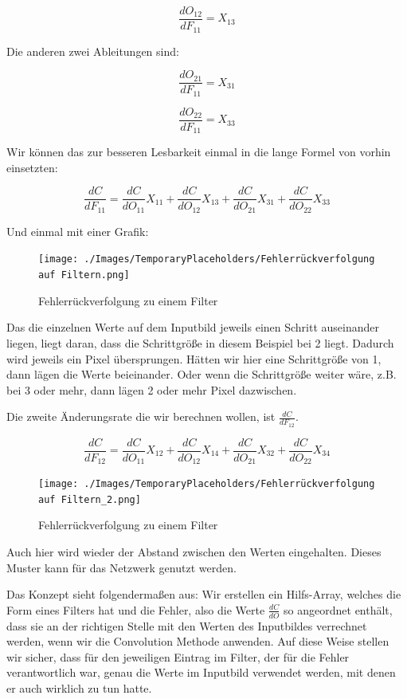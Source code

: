 \documentclass[12pt]{article}
\begin{document}
$$\frac{dO_{12}} {dF_{11}} = X_{13}$$

Die anderen zwei Ableitungen sind:


$$\frac{dO_{21}} {dF_{11}} = X_{31}$$

$$\frac{dO_{22}} {dF_{11}} = X_{33}$$

Wir können das zur besseren Lesbarkeit einmal in die lange Formel von vorhin einsetzten:

$$
\frac{dC}{dF_{11}} = 
\frac{dC} {dO_{11}} X_{11}+
\frac{dC} {dO_{12}} X_{13}+
\frac{dC} {dO_{21}} X_{31}+
\frac{dC} {dO_{22}} X_{33}
$$

Und einmal mit einer Grafik:

\begin{figure}[H]
\centering
\texttt{[image: ./Images/TemporaryPlaceholders/Fehlerrückverfolgung auf Filtern.png]}
\caption{Fehlerrückverfolgung zu einem Filter}
\label{Fehlerrückverfolgung zu einem Filter v1}
\end{figure}

Das die einzelnen Werte auf dem Inputbild jeweils einen Schritt auseinander liegen, liegt daran, dass die Schrittgröße in diesem Beispiel bei 2 liegt. Dadurch wird jeweils ein Pixel übersprungen. Hätten wir hier eine Schrittgröße von 1, dann lägen die Werte beieinander. Oder wenn die Schrittgröße weiter wäre, z.B. bei 3 oder mehr, dann lägen 2 oder mehr Pixel dazwischen.

Die zweite Änderungsrate die wir berechnen wollen, ist $\frac{dC}{dF_{12}}$. 


$$
\frac{dC}{dF_{12}} = 
\frac{dC} {dO_{11}} X_{12}+
\frac{dC} {dO_{12}} X_{14}+
\frac{dC} {dO_{21}} X_{32}+
\frac{dC} {dO_{22}} X_{34}
$$

\begin{figure}[H]
\centering
\texttt{[image: ./Images/TemporaryPlaceholders/Fehlerrückverfolgung auf Filtern\_2.png]}
\caption{Fehlerrückverfolgung zu einem Filter}
\label{Fehlerrückverfolgung zu einem Filter v2}
\end{figure}

Auch hier wird wieder der Abstand zwischen den Werten eingehalten. Dieses Muster kann für das Netzwerk genutzt werden. 

Das Konzept sieht folgendermaßen aus: Wir erstellen ein Hilfs-Array, welches die Form eines Filters hat und die Fehler, also die Werte $\frac{dC} {dO}$ so angeordnet enthält, dass sie an der richtigen Stelle mit den Werten des Inputbildes verrechnet werden, wenn wir die Convolution Methode anwenden. Auf diese Weise stellen wir sicher, dass für den jeweiligen Eintrag im Filter, der für die Fehler verantwortlich war, genau die Werte im Inputbild verwendet werden, mit denen er auch wirklich zu tun hatte.
\end{document}
